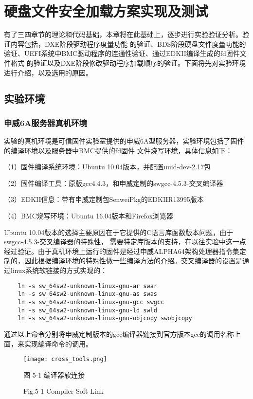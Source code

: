 %
%
\chapter{硬盘文件安全加载方案实现及测试}
有了三四章节的理论和代码基础，本章将在此基础上，逐步进行实验验证分析。验证内容包括，DXE阶段驱动程序度量功能
的验证、BDS阶段硬盘文件度量功能的验证、UEFI系统中BMC驱动程序的连通性验证、通过EDKII编译生成的fd固件文件格式
的验证以及DXE阶段修改驱动程序加载顺序的验证。下面将先对实验环境进行介绍，以及选用的原因。

%
%
\section{实验环境}

\subsection{申威6A服务器真机环境}
实验的真机环境是可信固件实验室提供的申威6A型服务器，实验环境包括了固件的编译环境以及服务器中BMC提供的fd固件
文件烧写环境，具体信息如下：
\par （1）固件编译系统环境：Ubuntu 10.04版本，并配置uuid-dev-2.17包
\par （2）固件编译工具：原版gcc4.4.3，和申威定制的swgcc-4.5.3-交叉编译器
\par （3）EDKII信息：带有申威定制包SenweiPkg的EDKIIR13995版本
\par （4）BMC烧写环境：Ubuntu 16.04版本和Firefox浏览器
\par Ubuntu 10.04版本的选择主要原因在于它提供的C语言库函数版本问题，由于swgcc-4.5.3-交叉编译器的特殊性，
需要特定库版本的支持，在以往实验中这一点经过验证。由于真机环境上运行的固件是经过申威ALPHA64架构处理器指令集定
制的，因此根据编译环境的特殊性做一些编译方法的介绍。交叉编译器的设置是通过linux系统软链接的方式实现的：

\begin{lstlisting}
    ln -s sw_64sw2-unknown-linux-gnu-ar swar
    ln -s sw_64sw2-unknown-linux-gnu-as swas
    ln -s sw_64sw2-unknown-linux-gnu-gcc swgcc
    ln -s sw_64sw2-unknown-linux-gnu-ld swld
    ln -s sw_64sw2-unknown-linux-gnu-objcopy swobjcopy    
\end{lstlisting}

通过以上命令分别将申威定制版本的gcc编译器链接到官方版本gcc的调用名称上面，来实现编译命令的调用。

\begin{figure}[htb]
    \vspace{0cm}   
    \setlength{\abovecaptionskip}{0.3cm}
	\centering
    \texttt{[image: cross\_tools.png]}
    \caption*{图 5-1 编译器软连接}
    \setlength{\belowcaptionskip}{-0.5cm}
    \caption*{Fig.5-1 Compiler Soft Link}
\end{figure}

